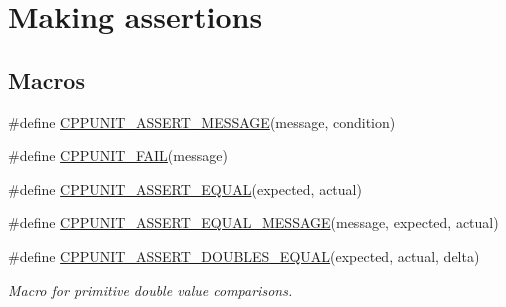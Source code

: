 \hypertarget{group___assertions}{\section{Making assertions}
\label{group___assertions}
}
\subsection*{Macros}
\begin{DoxyCompactItemize}
\item 
\#define \hyperlink{group___assertions_gadb3d7be52fb36db9b627ded165cfa335}{C\+P\+P\+U\+N\+I\+T\+\_\+\+A\+S\+S\+E\+R\+T\+\_\+\+M\+E\+S\+S\+A\+G\+E}(message, condition)
\item 
\#define \hyperlink{group___assertions_ga26aaaa22505b7a7b4978f0401a86f12a}{C\+P\+P\+U\+N\+I\+T\+\_\+\+F\+A\+I\+L}(message)
\item 
\#define \hyperlink{group___assertions_ga71162f05be07ef6817d156e77c68b1a3}{C\+P\+P\+U\+N\+I\+T\+\_\+\+A\+S\+S\+E\+R\+T\+\_\+\+E\+Q\+U\+A\+L}(expected, actual)
\item 
\#define \hyperlink{group___assertions_gafad9998a5abcf0bc12e88f24dbfb67be}{C\+P\+P\+U\+N\+I\+T\+\_\+\+A\+S\+S\+E\+R\+T\+\_\+\+E\+Q\+U\+A\+L\+\_\+\+M\+E\+S\+S\+A\+G\+E}(message, expected, actual)
\item 
\#define \hyperlink{group___assertions_ga9d88b1e379e4a9ba2a5e9e79763389ea}{C\+P\+P\+U\+N\+I\+T\+\_\+\+A\+S\+S\+E\+R\+T\+\_\+\+D\+O\+U\+B\+L\+E\+S\+\_\+\+E\+Q\+U\+A\+L}(expected, actual, delta)
\begin{DoxyCompactList}\small\item\em Macro for primitive double value comparisons.


\end{DoxyCompactList}
\end{DoxyCompactItemize}
